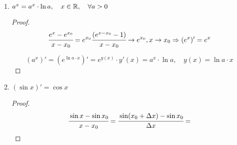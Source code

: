 \begin{corollary}

    \begin{enumerate}
        \item $a^{x} = a^{x} \cdot \ln a, \quad x\in \mathbb{R}, \quad \forall a>0$

        \begin{proof}
            $$\cfrac{e^{x} - e^{x_{0}}}{x-x_{0}} = e^{x_{0}}\cfrac{(e^{x-x_{0}}-1)}{x-x_{0}} \to e^{x_{0}}, x\to x_{0}\Rightarrow (e^{x})' = e^{x}$$
            
            $$
            (a^{x})' = (e^{\ln a \cdot x})' = e^{y(x)} \cdot y'(x) = a^{x} \cdot \ln a, \quad y(x) = \ln a\cdot x
            $$
        \end{proof}
        \item $ (\sin x)' = \cos x$
        \begin{proof}
        $$
        \cfrac{\sin x- \sin x_{0}}{x - x_{0}} = \cfrac{\sin (x_{0} +\Delta x) - \sin x_{0}}{\Delta x} = $$
        

\end{proof}
\end{enumerate}
\end{corollary}
